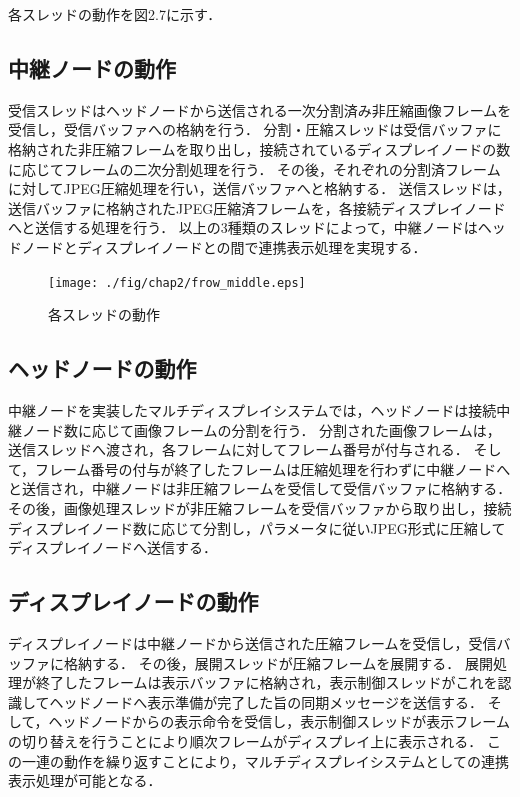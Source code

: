 各スレッドの動作を図2.7に示す．

\subsection*{中継ノードの動作}
受信スレッドはヘッドノードから送信される一次分割済み非圧縮画像フレームを受信し，受信バッファへの格納を行う．
分割・圧縮スレッドは受信バッファに格納された非圧縮フレームを取り出し，接続されているディスプレイノードの数に応じてフレームの二次分割処理を行う．
その後，それぞれの分割済フレームに対してJPEG圧縮処理を行い，送信バッファへと格納する．
送信スレッドは，送信バッファに格納されたJPEG圧縮済フレームを，各接続ディスプレイノードへと送信する処理を行う．
以上の3種類のスレッドによって，中継ノードはヘッドノードとディスプレイノードとの間で連携表示処理を実現する．

\begin{figure}[H]
  \hspace*{\fill}
  \texttt{[image: ./fig/chap2/frow\_middle.eps]}
  \hspace*{\fill}
  \caption{各スレッドの動作}
\end{figure}

\subsection*{ヘッドノードの動作}
中継ノードを実装したマルチディスプレイシステムでは，ヘッドノードは接続中継ノード数に応じて画像フレームの分割を行う．
分割された画像フレームは，送信スレッドへ渡され，各フレームに対してフレーム番号が付与される．
そして，フレーム番号の付与が終了したフレームは圧縮処理を行わずに中継ノードへと送信され，中継ノードは非圧縮フレームを受信して受信バッファに格納する．
その後，画像処理スレッドが非圧縮フレームを受信バッファから取り出し，接続ディスプレイノード数に応じて分割し，パラメータに従いJPEG形式に圧縮してディスプレイノードへ送信する．

\subsection*{ディスプレイノードの動作}
ディスプレイノードは中継ノードから送信された圧縮フレームを受信し，受信バッファに格納する．
その後，展開スレッドが圧縮フレームを展開する．
展開処理が終了したフレームは表示バッファに格納され，表示制御スレッドがこれを認識してヘッドノードへ表示準備が完了した旨の同期メッセージを送信する．
そして，ヘッドノードからの表示命令を受信し，表示制御スレッドが表示フレームの切り替えを行うことにより順次フレームがディスプレイ上に表示される．
この一連の動作を繰り返すことにより，マルチディスプレイシステムとしての連携表示処理が可能となる．

